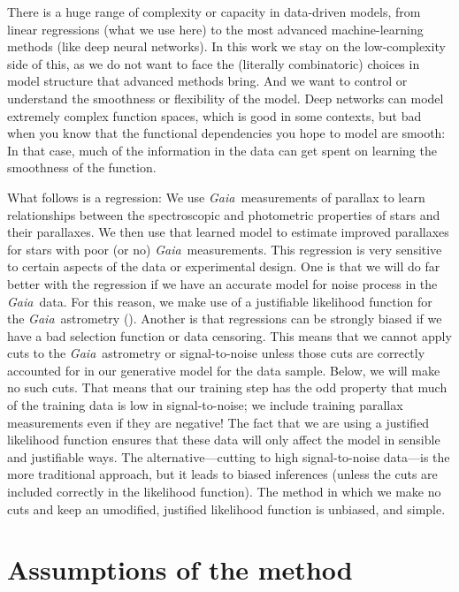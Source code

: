 \documentclass[modern]{aastex62}
\newcommand{\project}[1]{\textsl{#1}}
\newcommand{\gaia}{\project{Gaia}}
\begin{document}
There is a huge range of complexity or capacity in data-driven
models, from linear regressions (what we use here) to the most advanced machine-learning
methods (like deep neural networks).
In this work we stay on the low-complexity side of this, as
we do not want to face the (literally combinatoric) choices in model structure that
advanced methods bring.
And we want to control or understand the smoothness or flexibility of the model.
Deep networks can model extremely complex function spaces, which is good in some
contexts, but bad when you know that the functional dependencies you hope to
model are smooth:
In that case, much of the information in the data can get spent on learning the
smoothness of the function.

What follows is a regression:
We use \gaia\ measurements of parallax to learn relationships between 
the spectroscopic and photometric properties of stars and their parallaxes.
We then use that learned model to estimate improved parallaxes for stars with
poor (or no) \gaia\ measurements.
This regression is very sensitive to certain aspects of the data or experimental
design.
One is that we will do far better with the regression if we have an accurate
model for noise process in the \gaia\ data.
For this reason, we make use of a justifiable likelihood function for the
\gaia\ astrometry (\citealt{gaialf}).
Another is that regressions can be strongly biased if we have a bad selection function
or data censoring.
This means that we cannot apply cuts to the \gaia\ astrometry or signal-to-noise
unless those cuts are correctly accounted for in our generative model for the
data sample.
Below, we will make no such cuts. That means that our training step has the odd
property that much of the training data is low in signal-to-noise; we include
training parallax measurements even if they are negative!
The fact that we are using a justified likelihood function ensures that these
data will only affect the model in sensible and justifiable ways.
The alternative---cutting to high signal-to-noise data---is the more traditional
approach, but it leads to biased inferences (unless the cuts are included correctly
in the likelihood function).
The method in which we make no cuts and keep an umodified, justified likelihood function
is unbiased, and simple.

\section{Assumptions of the method}\label{sec:assumptions}
\end{document}
